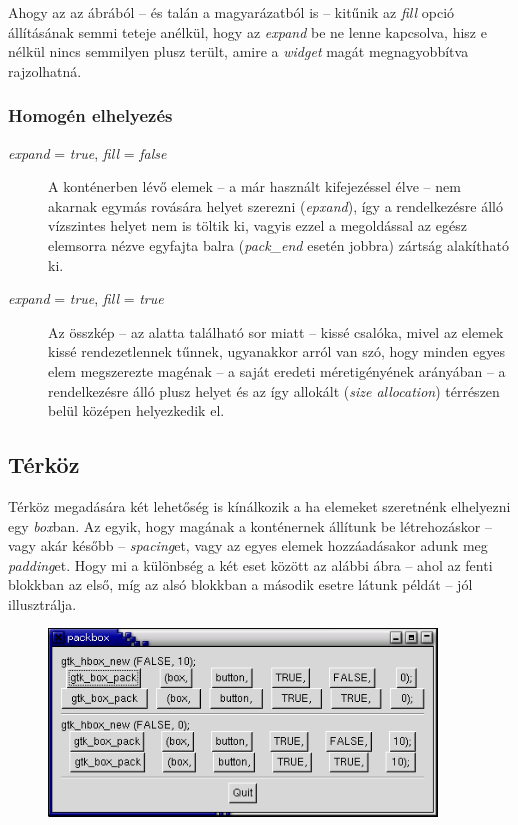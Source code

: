 \documentclass[a4paper,10pt]{article}
\begin{document}
Ahogy az az ábrából -- és talán a magyarázatból is -- kitűnik az \textit{fill} opció állításának semmi teteje anélkül, hogy az \textit{expand} be ne lenne kapcsolva, hisz e nélkül nincs semmilyen plusz terült, amire a \textit{widget} magát megnagyobbítva rajzolhatná.

\subsubsection{Homogén elhelyezés}

\begin{description}
 \item[\textit{expand} = \textit{true}, \textit{fill} = \textit{false}] A konténerben lévő elemek -- a már használt kifejezéssel élve -- nem akarnak egymás rovására helyet szerezni (\textit{epxand}), így a rendelkezésre álló vízszintes helyet nem is töltik ki, vagyis ezzel a megoldással az egész elemsorra nézve egyfajta balra (\textit{pack\_end} esetén jobbra) zártság alakítható ki.

 \item[\textit{expand} = \textit{true}, \textit{fill} = \textit{true}] Az összkép -- az alatta található sor miatt -- kissé csalóka, mivel az elemek kissé rendezetlennek tűnnek, ugyanakkor arról van szó, hogy minden egyes elem megszerezte magénak -- a saját eredeti méretigényének arányában -- a rendelkezésre álló plusz helyet és az így allokált (\textit{size allocation}) térrészen belül középen helyezkedik el.
\end{description}

\subsection{Térköz}

Térköz megadására két lehetőség is kínálkozik a ha elemeket szeretnénk elhelyezni egy \textit{box}ban. Az egyik, hogy magának a konténernek állítunk be létrehozáskor -- vagy akár később -- \textit{spacing}et, vagy az egyes elemek hozzáadásakor adunk meg \textit{padding}et. Hogy mi a különbség a két eset között az alábbi ábra -- ahol az fenti blokkban az első, míg az alsó blokkban a második esetre látunk példát -- jól illusztrálja.

\vspace{12 pt}
\begin{figure}[H]
\begin{center}
\includegraphics[height=50mm]{packbox2.png}
\end{center}
\end{figure}
\end{document}
